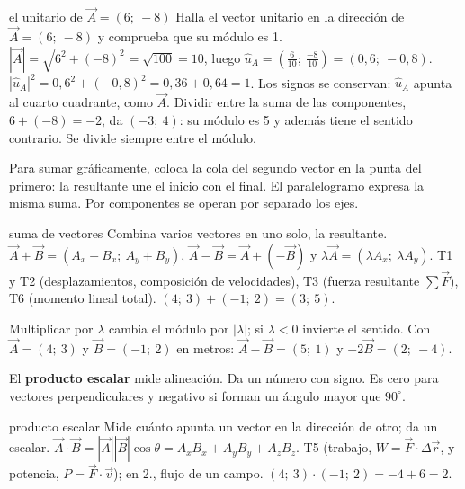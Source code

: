 \documentclass[11pt,a4paper]{article}
\begin{document}
\begin{examplebox}{el unitario de $\vec A=(6;\ -8)$}
 Halla el vector unitario en la direcci\'on de $\vec A=(6;\ -8)$
y comprueba que su m\'odulo es 1.
\solutionblock
{} $|\vec A|=\sqrt{6^2+(-8)^2}=\sqrt{100}=10$, luego
$\hat u_A=\left(\tfrac{6}{10};\ \tfrac{-8}{10}\right)=(0{,}6;\ -0{,}8)$.
 $|\hat u_A|^2=0{,}6^2+(-0{,}8)^2=0{,}36+0{,}64=1$.
Los signos se conservan: $\hat u_A$ apunta al cuarto cuadrante, como $\vec A$.
 Dividir entre la suma de las componentes, $6+(-8)=-2$, da
$(-3;\ 4)$: su m\'odulo es 5 y adem\'as tiene el sentido contrario.
Se divide siempre entre el m\'odulo.
\end{examplebox}

Para sumar gr\'aficamente, coloca la cola del segundo vector en la punta del primero:
la resultante une el inicio con el final. El paralelogramo expresa la misma suma.
Por componentes se operan por separado los ejes.

\begin{toolbox}{suma de vectores}
 Combina varios vectores en uno solo, la resultante.
 $\vec A+\vec B=(A_x+B_x;\ A_y+B_y)$,
$\vec A-\vec B=\vec A+(-\vec B)$ y $\lambda\vec A=(\lambda A_x;\ \lambda A_y)$.
 T1 y T2 (desplazamientos, composici\'on de velocidades),
T3 (fuerza resultante $\sum\vec F$), T6 (momento lineal total).
 $(4;\ 3)+(-1;\ 2)=(3;\ 5)$.
\end{toolbox}

Multiplicar por $\lambda$ cambia el m\'odulo por $|\lambda|$; si $\lambda<0$ invierte el
sentido. Con $\vec A=(4;\ 3)$ y $\vec B=(-1;\ 2)$ en metros:
$\vec A-\vec B=(5;\ 1)$ y $-2\vec B=(2;\ -4)$.

El \textbf{producto escalar} mide alineaci\'on. Da un n\'umero con signo.
Es cero para vectores perpendiculares y negativo si forman un \'angulo mayor que $90^\circ$.

\begin{toolbox}{producto escalar}
 Mide cu\'anto apunta un vector en la direcci\'on de otro;
da un escalar.
$\vec A\cdot\vec B=|\vec A||\vec B|\cos\theta=A_xB_x+A_yB_y+A_zB_z$.
 T5 (trabajo, $W=\vec F\cdot\Delta\vec r$, y potencia,
$P=\vec F\cdot\vec v$); en 2.\textordmasculine, flujo de un campo.
 $(4;\ 3)\cdot(-1;\ 2)=-4+6=2$.
\end{toolbox}
\end{document}
